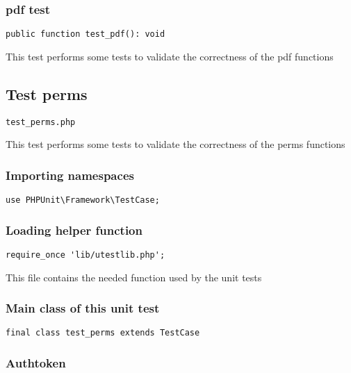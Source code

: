 \documentclass[a4paper]{article}
\begin{document}
\hypertarget{toc294}{}
\subsubsection{pdf test}

\begin{lstlisting}
public function test_pdf(): void
\end{lstlisting}

This test performs some tests to validate the correctness
of the pdf functions

\hypertarget{toc295}{}
\subsection{Test perms}

\begin{lstlisting}
test_perms.php
\end{lstlisting}

This test performs some tests to validate the correctness
of the perms functions

\hypertarget{toc296}{}
\subsubsection{Importing namespaces}

\begin{lstlisting}
use PHPUnit\Framework\TestCase;
\end{lstlisting}

\hypertarget{toc297}{}
\subsubsection{Loading helper function}

\begin{lstlisting}
require_once 'lib/utestlib.php';
\end{lstlisting}

This file contains the needed function used by the unit tests

\hypertarget{toc298}{}
\subsubsection{Main class of this unit test}

\begin{lstlisting}
final class test_perms extends TestCase
\end{lstlisting}

\hypertarget{toc299}{}
\subsubsection{Authtoken}
\end{document}
